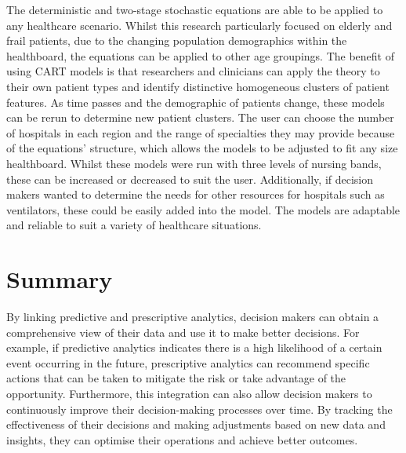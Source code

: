 \documentclass[../thesis.tex]{subfiles}
\begin{document}
The deterministic and two-stage stochastic equations are able to be applied to any healthcare scenario. Whilst this research particularly focused on elderly and frail patients, due to the changing population demographics within the healthboard, the equations can be applied to other age groupings. The benefit of using CART models is that researchers and clinicians can apply the theory to their own patient types and identify distinctive homogeneous clusters of patient features. As time passes and the demographic of patients change, these models can be rerun to determine new patient clusters. The user can choose the number of hospitals in each region and the range of specialties they may provide because of the equations' structure, which allows the models to be adjusted to fit any size healthboard. Whilst these models were run with three levels of nursing bands, these can be increased or decreased to suit the user. Additionally, if decision makers wanted to determine the needs for other resources for hospitals such as ventilators, these could be easily added into the model. The models are adaptable and reliable to suit a variety of healthcare situations.


\section{Summary}
By linking predictive and prescriptive analytics, decision makers can obtain a comprehensive view of their data and use it to make better decisions. For example, if predictive analytics indicates there is a high likelihood of a certain event occurring in the future, prescriptive analytics can recommend specific actions that can be taken to mitigate the risk or take advantage of the opportunity. Furthermore, this integration can also allow decision makers to continuously improve their decision-making processes over time. By tracking the effectiveness of their decisions and making adjustments based on new data and insights, they can optimise their operations and achieve better outcomes.
\end{document}
